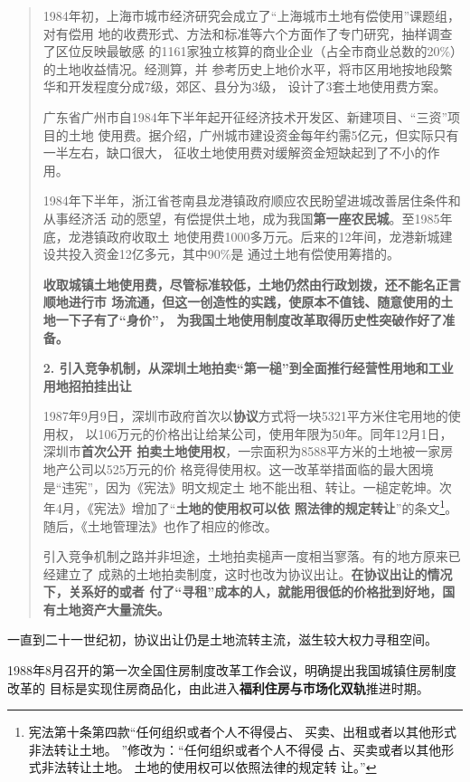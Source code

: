 \begin{quotation}
  1984年初，上海市城市经济研究会成立了“上海城市土地有偿使用”课题组，对有偿用
  地的收费形式、方法和标准等六个方面作了专门研究，抽样调查了区位反映最敏感
  的1161家独立核算的商业企业（占全市商业总数的20\%）的土地收益情况。经测算，并
  参考历史上地价水平，将市区用地按地段繁华和开发程度分成7级，郊区、县分为3级，
  设计了3套土地使用费方案。

  广东省广州市自1984年下半年起开征经济技术开发区、新建项目、“三资”项目的土地
  使用费。据介绍，广州城市建设资金每年约需5亿元，但实际只有一半左右，缺口很大，
  征收土地使用费对缓解资金短缺起到了不小的作用。

  1984年下半年，浙江省苍南县龙港镇政府顺应农民盼望进城改善居住条件和从事经济活
  动的愿望，有偿提供土地，成为我国\textbf{第一座农民城}。至1985年底，龙港镇政府收取土
  地使用费1000多万元。后来的12年间，龙港新城建设共投入资金12亿多元，其中90\%是
  通过土地有偿使用筹措的。

  \textbf{收取城镇土地使用费，尽管标准较低，土地仍然由行政划拨，还不能名正言顺地进行市
    场流通，但这一创造性的实践，使原本不值钱、随意使用的土地一下子有了“身价”，
    为我国土地使用制度改革取得历史性突破作好了准备。}

  \textbf{2. 引入竞争机制，从深圳土地拍卖“第一槌”到全面推行经营性用地和工业用地招拍挂出让}

  1987年9月9日，深圳市政府首次以\textbf{协议}方式将一块5321平方米住宅用地的使用权，
  以106万元的价格出让给某公司，使用年限为50年。同年12月1日，深圳市\textbf{首次公开
    拍卖土地使用权}，一宗面积为8588平方米的土地被一家房地产公司以525万元的价
  格竞得使用权。这一改革举措面临的最大困境是“违宪”，因为《宪法》明文规定土
  地不能出租、转让。一槌定乾坤。次年4月，《宪法》增加了“\textbf{土地的使用权可以依
    照法律的规定转让}”的条文\footnote{宪法第十条第四款“任何组织或者个人不得侵占、
    买卖、出租或者以其他形式非法转让土地。 ”修改为：“任何组织或者个人不得侵
    占、买卖或者以其他形式非法转让土地。 土地的使用权可以依照法律的规定转
    让。”}。随后，《土地管理法》也作了相应的修改。


  引入竞争机制之路并非坦途，土地拍卖槌声一度相当寥落。有的地方原来已经建立了
  成熟的土地拍卖制度，这时也改为协议出让。\textbf{在协议出让的情况下，关系好的或者
    付了“寻租”成本的人，就能用很低的价格批到好地，国有土地资产大量流失。}
\end{quotation}

一直到二十一世纪初，协议出让仍是土地流转主流，滋生较大权力寻租空间。

1988年8月召开的第一次全国住房制度改革工作会议，明确提出我国城镇住房制度改革的
目标是实现住房商品化，由此进入\textbf{福利住房与市场化双轨}推进时期。

